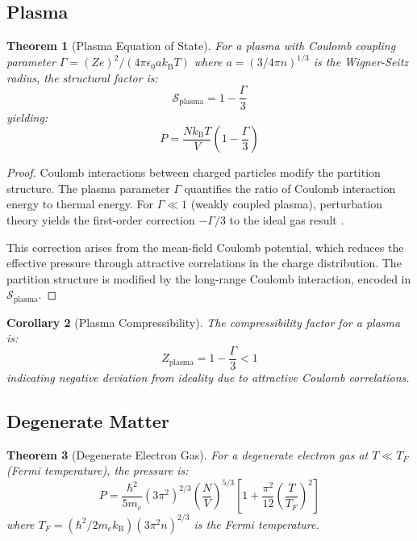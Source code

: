 \documentclass[11pt,twocolumn,a4paper]{article}
\newtheorem{theorem}{Theorem}[section]
\newtheorem{corollary}[theorem]{Corollary}
\theoremstyle{definition}
\theoremstyle{remark}
\newcommand{\kB}{k_{\mathrm{B}}}
\begin{document}
\subsection{Plasma}

\begin{theorem}[Plasma Equation of State]
\label{thm:plasma_eos}
For a plasma with Coulomb coupling parameter $\Gamma = (Ze)^2/(4\pi\epsilon_0 a \kB T)$ where $a = (3/4\pi n)^{1/3}$ is the Wigner-Seitz radius, the structural factor is:
\begin{equation}
\mathcal{S}_{\mathrm{plasma}} = 1 - \frac{\Gamma}{3}
\label{eq:plasma_structure}
\end{equation}
yielding:
\begin{equation}
P = \frac{N\kB T}{V}\left(1 - \frac{\Gamma}{3}\right)
\label{eq:plasma_eos}
\end{equation}
\end{theorem}

\begin{proof}
Coulomb interactions between charged particles modify the partition structure. The plasma parameter $\Gamma$ quantifies the ratio of Coulomb interaction energy to thermal energy. For $\Gamma \ll 1$ (weakly coupled plasma), perturbation theory yields the first-order correction $-\Gamma/3$ to the ideal gas result \citep{dubin1999trapped}.

This correction arises from the mean-field Coulomb potential, which reduces the effective pressure through attractive correlations in the charge distribution. The partition structure is modified by the long-range Coulomb interaction, encoded in $\mathcal{S}_{\mathrm{plasma}}$.
\end{proof}

\begin{corollary}[Plasma Compressibility]
\label{cor:plasma_compressibility}
The compressibility factor for a plasma is:
\begin{equation}
Z_{\mathrm{plasma}} = 1 - \frac{\Gamma}{3} < 1
\label{eq:plasma_compressibility}
\end{equation}
indicating negative deviation from ideality due to attractive Coulomb correlations.
\end{corollary}

\subsection{Degenerate Matter}

\begin{theorem}[Degenerate Electron Gas]
\label{thm:degenerate_eos}
For a degenerate electron gas at $T \ll T_F$ (Fermi temperature), the pressure is:
\begin{equation}
P = \frac{\hbar^2}{5m_e}(3\pi^2)^{2/3} \left(\frac{N}{V}\right)^{5/3} \left[1 + \frac{\pi^2}{12}\left(\frac{T}{T_F}\right)^2\right]
\label{eq:degenerate_eos}
\end{equation}
where $T_F = (\hbar^2/2m_e\kB)(3\pi^2 n)^{2/3}$ is the Fermi temperature.
\end{theorem}
\end{document}
